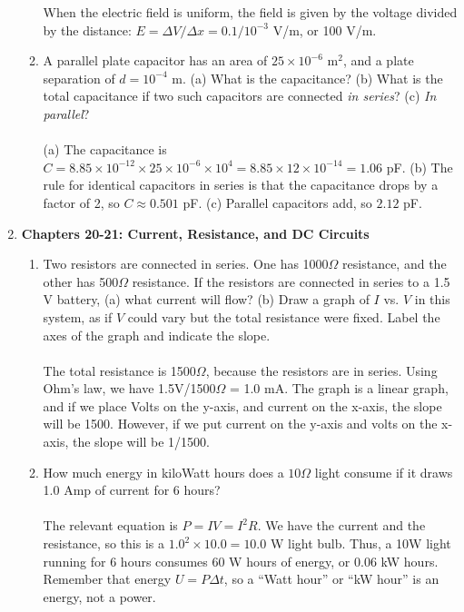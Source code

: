 \documentclass[10pt]{article}
\begin{document}
\begin{enumerate}
\begin{enumerate}
When the electric field is uniform, the field is given by the voltage divided by the distance: $E = \Delta V / \Delta x = 0.1/10^{-3}$ V/m, or 100 V/m. \\
\item A parallel plate capacitor has an area of $25 \times 10^{-6}$ m$^2$, and a plate separation of $d = 10^{-4}$ m.  (a) What is the capacitance? (b) What is the total capacitance if two such capacitors are connected \textit{in series}? (c) \textit{In parallel}? \\ \\
(a) The capacitance is $C = 8.85 \times 10^{-12} \times 25 \times 10^{-6} \times 10^{4} = 8.85\times 12 \times 10^{-14} = 1.06$ pF.  (b) The rule for identical capacitors in series is that the capacitance drops by a factor of 2, so $C \approx 0.501$ pF.  (c) Parallel capacitors add, so $2.12$ pF.
\end{enumerate}
\item \textbf{Chapters 20-21: Current, Resistance, and DC Circuits}
\begin{enumerate}
\item Two resistors are connected in series.  One has 1000$\Omega$ resistance, and the other has 500$\Omega$ resistance.  If the resistors are connected in series to a 1.5 V battery, (a) what current will flow? (b) Draw a graph of $I$ vs. $V$ in this system, as if $V$ could vary but the total resistance were fixed.  Label the axes of the graph and indicate the slope. \\ \\
The total resistance is 1500$\Omega$, because the resistors are in series.  Using Ohm's law, we have 1.5V/1500$\Omega$ = 1.0 mA.  The graph is a linear graph, and if we place Volts on the y-axis, and current on the x-axis, the slope will be 1500.  However, if we put current on the y-axis and volts on the x-axis, the slope will be 1/1500. \\
\item How much energy in kiloWatt hours does a $10\Omega$ light consume if it draws 1.0 Amp of current for 6 hours? \\ \\
The relevant equation is $P=IV = I^2 R$.  We have the current and the resistance, so this is a $1.0^2 \times 10.0 = 10.0$ W light bulb.  Thus, a 10W light running for 6 hours consumes 60 W hours of energy, or 0.06 kW hours.  Remember that energy $U = P \Delta t$, so a ``Watt hour'' or ``kW hour'' is an energy, not a power. \\
\begin{figure}

\end{figure}
\end{enumerate}
\end{enumerate}
\end{document}
